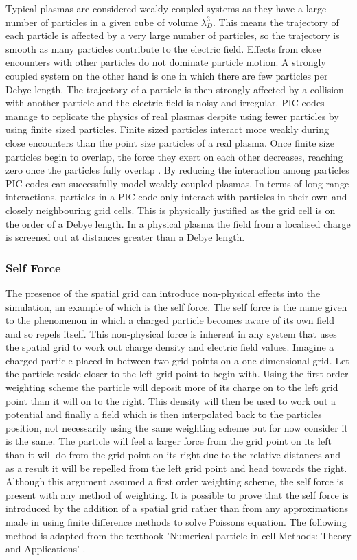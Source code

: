 Typical plasmas are considered weakly coupled systems as they have a large number of particles in a given cube of volume $\lambda_D ^3$. This means the trajectory of each particle is affected by a very large number of particles, so the trajectory is smooth as many particles contribute to the electric field. Effects from close encounters with other particles do not dominate particle motion. A strongly coupled system on the other hand is one in which there are few particles per Debye length. The trajectory of a particle is then strongly affected by a collision with another particle and the electric field is noisy and irregular. PIC codes manage to replicate the physics of real plasmas despite using fewer particles by using finite sized particles. Finite sized particles interact more weakly during close encounters than the point size particles of a real plasma. Once finite size particles begin to overlap, the force they exert on each other decreases, reaching zero once the particles fully overlap \cite{Lapenta}. By reducing the interaction among particles PIC codes can successfully model weakly coupled plasmas. In terms of long range interactions, particles in a PIC code only interact with particles in their own and closely neighbouring grid cells. This is physically justified as the grid cell is on the order of a Debye length. In a physical plasma the field from a localised charge is screened out at distances greater than a Debye length. 
 

\subsubsection{Self Force}
The presence of the spatial grid can introduce non-physical effects into the simulation, an example of which is the self force. The self force is the name given to the phenomenon in which a charged particle becomes aware of its own field and so repels itself. This non-physical force is inherent in any system that uses the spatial grid to work out charge density and electric field values. Imagine a charged particle placed in between two grid points on a one dimensional grid. Let the particle reside closer to the left grid point to begin with. Using the first order weighting scheme the particle will deposit more of its charge on to the left grid point than it will on to the right. This density will then be used to work out a potential and finally a field which is then interpolated back to the particles position, not necessarily using the same weighting scheme but for now consider it is the same. The particle will feel a larger force from the grid point on its left than it will do from the grid point on its right due to the relative distances and as a result it will be repelled from the left grid point and head towards the right. Although this argument assumed a first order weighting scheme, the self force is present with any method of weighting. 
It is possible to prove that the self force is introduced by the addition of a spatial grid rather than from any approximations made in using finite difference methods to solve Poissons equation. The following method is adapted from the textbook 'Numerical particle-in-cell Methods: Theory and Applications' \cite{selfforce}. 

